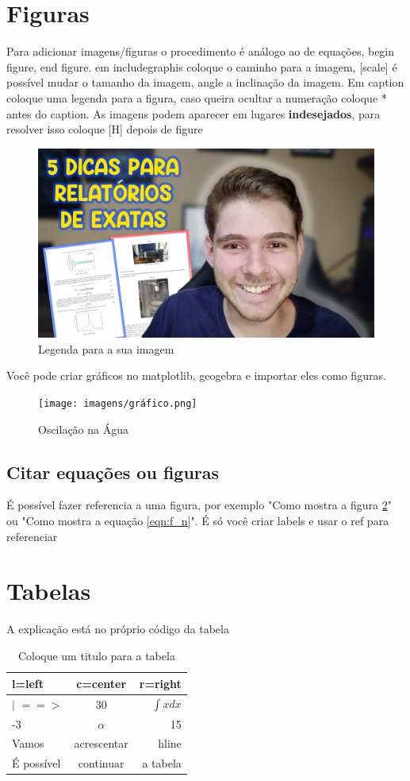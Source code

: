 \documentclass[a4paper]{article}
\begin{document}
\section{Figuras}
Para adicionar imagens/figuras o procedimento é análogo ao de equações, begin figure, end figure. em includegraphis coloque o caminho para a imagem, [scale] é possível mudar o tamanho da imagem, angle a inclinação da imagem. Em caption coloque uma legenda para a figura, caso queira ocultar a numeração coloque * antes do caption. As imagens podem aparecer em lugares \textbf{indesejados}, para resolver isso coloque [H] depois de figure
\begin{figure}[H]
    \centering \includegraphics[scale=0.25,angle=10]{imagens/thumbnail.jpg}
    \caption{Legenda para a sua imagem}
    \label{thumbnail}
\end{figure}

Você pode criar gráficos no matplotlib, geogebra e importar eles como figuras.

\begin{figure}[H]
    \centering \texttt{[image: imagens/gráfico.png]}
    \caption{Oscilação na Água}
    \label{thumbnail}
\end{figure}


\subsection{Citar equações ou figuras}
É possível fazer referencia a uma figura, por exemplo "Como mostra a figura \ref{thumbnail}" ou "Como mostra a equação \ref{eqn:f_n}". É só você criar labels e usar o ref para referenciar
\section{Tabelas}
 A explicação está no próprio código da tabela
\begin{table}[H]
\centering
\begin{tabular}{l|c r}
l=left & c=center & r=right \\\hline
$|$ $==>$ & 30 & $\int xdx$\\
-3 & $\alpha$ & 15 \\
Vamos & acrescentar & hline \\\hline
É possível & continuar & a tabela
\end{tabular}
\label{tabela}
\caption{Coloque um titulo para a tabela}
\end{table}
\end{document}
